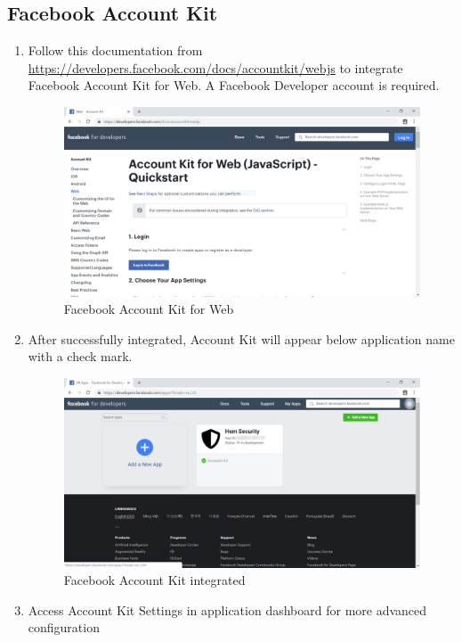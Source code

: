 \tocless\subsection{Facebook Account Kit}
\begin{enumerate}
	\item Follow this documentation from \href{https://developers.facebook.com/docs/accountkit/webjs}{https://developers.facebook.com/docs/accountkit/webjs} to integrate Facebook Account Kit for Web. A Facebook Developer account is required.
	      \begin{center}
	      	\begin{figure}[H]
	      		\centering
	      		\includegraphics[width=0.6\columnwidth]{images/appendixA/Facebook-AccountKit-Docs.PNG}
	      		\caption{Facebook Account Kit for Web}
	      	\end{figure}
	      \end{center}
	\item After successfully integrated, Account Kit will appear below application name with a check mark.
	      \begin{center}
	      	\begin{figure}[H]
	      		\centering
	      		\includegraphics[width=0.6\columnwidth]{images/appendixA/Facebook-AccountKit-Integrated.png}
	      		\caption{Facebook Account Kit integrated}
	      	\end{figure}
			\vspace{-1cm}
	      \end{center}
	\item Access Account Kit Settings in application dashboard for more advanced configuration
	      \begin{center}

\end{center}
\end{enumerate}
